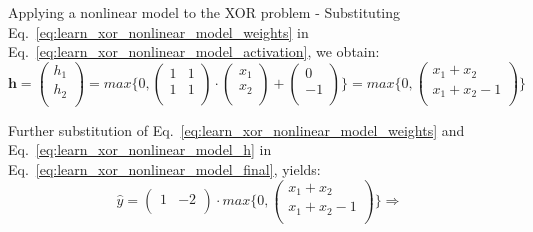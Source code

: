 \begin{frame}[t,allowframebreaks]{Applying a nonlinear model to the XOR problem -}
    Substituting Eq.~\ref{eq:learn_xor_nonlinear_model_weights} in 
    Eq.~\ref{eq:learn_xor_nonlinear_model_activation}, we obtain:
    \begin{equation}
        \mathbf{h} = 
        \begin{pmatrix}
            h_1 \\ 
            h_2 \\
        \end{pmatrix} =
        max \Bigg\{0, 
        \begin{pmatrix}
            1 & 1 \\
            1 & 1 \\
        \end{pmatrix} 
        \cdot
        \begin{pmatrix}
            x_1 \\
            x_2 \\
        \end{pmatrix}
        +         
        \begin{pmatrix}
            0 \\
            -1 \\
        \end{pmatrix}
        \Bigg\} =
        max \Bigg\{0, 
        \begin{pmatrix}
          x_1+x_2     \\ 
          x_1+x_2-1   \\
        \end{pmatrix}
        \Bigg\}
        \label{eq:learn_xor_nonlinear_model_h} 
    \end{equation}

    \framebreak

    Further substitution of 
    Eq.~\ref{eq:learn_xor_nonlinear_model_weights} and
    Eq.~\ref{eq:learn_xor_nonlinear_model_h} in
    Eq.~\ref{eq:learn_xor_nonlinear_model_final}, yields:
    \begin{equation*}
        \hat{y} = 
        \begin{pmatrix}
            1  & -2 \\
        \end{pmatrix} 
        \cdot
        max \Bigg\{0, 
        \begin{pmatrix}
          x_1+x_2     \\ 
          x_1+x_2-1   \\
        \end{pmatrix}
        \Bigg\} \Rightarrow
    \end{equation*}        


\end{frame}
